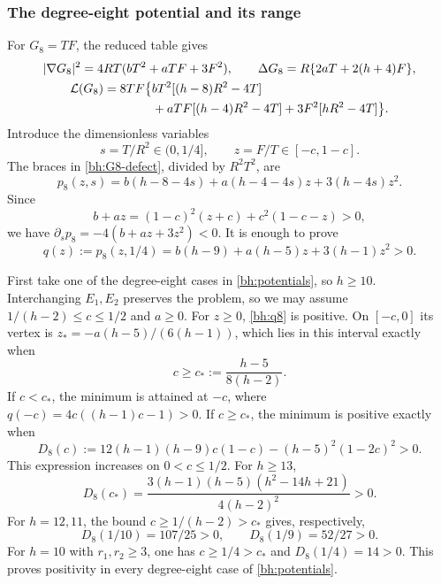 \subsubsection{The degree-eight potential and its range}

For $G_8=TF$, the reduced table gives
\begin{gather}
 \lvert \nabla G_8\rvert^2=4RT(bT^2+aTF+3F^2),\qquad
 \Delta G_8=R\{2aT+2(h+4)F\},\label{bh:G8-basic}\\
 \begin{split}\label{bh:G8-defect}
 \mathcal L(G_8)=8TF\big\{&bT^2[(h-8)R^2-4T]\\
                  &+aTF[(h-4)R^2-4T]
                    +3F^2[hR^2-4T]\big\}.
 \end{split}
\end{gather}
Introduce the dimensionless variables
\[
 s=T/R^2\in(0,1/4],\qquad z=F/T\in[-c,1-c].
\]
The braces in \eqref{bh:G8-defect}, divided by $R^2T^2$, are
\begin{equation}\label{bh:p8}
 p_8(z,s)=b(h-8-4s)+a(h-4-4s)z+3(h-4s)z^2.
\end{equation}
Since
\[
 b+az=(1-c)^2(z+c)+c^2(1-c-z)>0,
\]
we have $\partial_s p_8=-4(b+az+3z^2)<0$.  It is enough to prove
\begin{equation}\label{bh:q8}
 q(z):=p_8(z,1/4)=b(h-9)+a(h-5)z+3(h-1)z^2>0.
\end{equation}

First take one of the degree-eight cases in \eqref{bh:potentials},
so $h\geq10$. Interchanging $E_1,E_2$ preserves the problem, so we
may assume
$1/(h-2)\leq c\leq1/2$ and $a\geq0$.  For $z\geq0$,
\eqref{bh:q8} is positive.  On $[-c,0]$ its vertex is
$z_*=-a(h-5)/(6(h-1))$, which lies in this interval exactly when
\[
 c\geq c_*:=\frac{h-5}{8(h-2)}.
\]
If $c<c_*$, the minimum is attained at $-c$, where \(q(-c)=4c((h-1)c-1)>0\).
If $c\geq c_*$, the minimum is positive exactly when
\begin{equation}\label{bh:D8}
 D_8(c):=12(h-1)(h-9)c(1-c)-(h-5)^2(1-2c)^2>0.
\end{equation}
This expression increases on $0<c\leq1/2$.  For $h\geq13$,
\[
 D_8(c_*)=
 \frac{3(h-1)(h-5)(h^2-14h+21)}{4(h-2)^2}>0.
\]
For $h=12,11$, the bound $c\geq1/(h-2)>c_*$ gives, respectively,
\[
 D_8(1/10)=107/25>0,\qquad D_8(1/9)=52/27>0.
\]
For $h=10$ with $r_1,r_2\geq3$, one has $c\geq1/4>c_*$ and
$D_8(1/4)=14>0$. This proves positivity in every degree-eight
case of \eqref{bh:potentials}.

